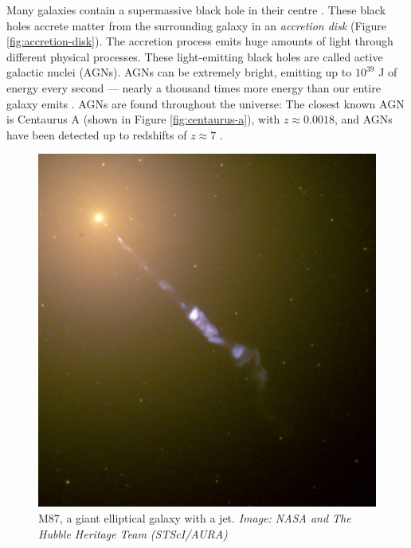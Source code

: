         Many galaxies contain a supermassive black hole in their centre \citeme.
        These black holes accrete matter from the surrounding galaxy in an
        \emph{accretion disk} (Figure \ref{fig:accretion-disk}). The accretion
        process emits huge amounts of light through different physical
        processes. These light-emitting black holes are called active galactic
        nuclei (AGNs). AGNs can be extremely bright, emitting up to $10^{39}$ J
        of energy every second --- nearly a thousand times more energy than our
        entire galaxy emits \citep{begelman84}. AGNs are found throughout the
        universe: The closest known AGN is Centaurus A (shown in Figure
        \ref{fig:centaurus-a}), with $z \approx 0.0018$, and AGNs have been
        detected up to redshifts of $z \approx 7$ \citeme {}.

        \begin{figure}
            \centering
            \includegraphics[height=0.3\textheight]{images/M87_jet.jpg}
            \caption{M87, a giant elliptical galaxy with a jet. \emph{Image:
                NASA and The Hubble Heritage Team (STScI/AURA)}}
            \label{fig:m87}
        \end{figure}

